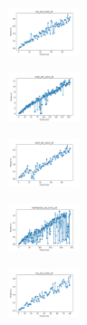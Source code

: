 \begin{figure}[H]    
    \centering
    \begin{subfigure}
        \centering
        \includegraphics[width=0.234\textwidth]{img/bl/iris_set_const_20_949004259_time.png}
    \end{subfigure}
    \hfill
    \begin{subfigure}
        \centering
        \includegraphics[width=0.234\textwidth]{img/bl/ecoli_set_const_20_949004259_time.png}
    \end{subfigure}
    \hfill
    \begin{subfigure}
        \centering
        \includegraphics[width=0.234\textwidth]{img/bl/rand_set_const_20_949004259_time.png}
    \end{subfigure}
    \hfill
    \begin{subfigure}
        \centering
        \includegraphics[width=0.234\textwidth]{img/bl/newthyroid_set_const_20_949004259_time.png}
    \end{subfigure}
    \hfill
    \begin{subfigure}
        \centering
        \includegraphics[width=0.234\textwidth]{img/bl/iris_set_const_20_589741062_time.png}
    \end{subfigure}
    \hfill
    \begin{subfigure}

\end{subfigure}
\end{figure}
